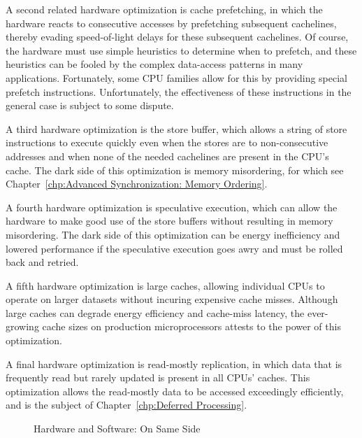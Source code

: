 A second related hardware optimization is cache prefetching, in which
the hardware reacts to consecutive accesses by prefetching subsequent
cachelines, thereby evading speed-of-light delays for these
subsequent cachelines.
Of course, the hardware must use simple heuristics to determine when
to prefetch, and these heuristics can be fooled by the complex data-access
patterns in many applications.
Fortunately, some CPU families allow for this by providing special
prefetch instructions.
Unfortunately, the effectiveness of these instructions in the general
case is subject to some dispute.

A third hardware optimization is the store buffer, which allows a string
of store instructions to execute quickly even when the stores are to
non-consecutive addresses and when none of the needed cachelines are
present in the CPU's cache.
The dark side of this optimization is memory misordering, for which see
Chapter~\ref{chp:Advanced Synchronization: Memory Ordering}.

A fourth hardware optimization is speculative execution, which can
allow the hardware to make good use of the store buffers without
resulting in memory misordering.
The dark side of this optimization can be energy inefficiency and
lowered performance if the speculative execution goes awry and must
be rolled back and retried.

A fifth hardware optimization is large caches, allowing individual
CPUs to operate on larger datasets without incuring expensive cache
misses.
Although large caches can degrade energy efficiency and cache-miss
latency, the ever-growing cache sizes on production microprocessors
attests to the power of this optimization.

A final hardware optimization is read-mostly replication, in which
data that is frequently read but rarely updated is present in all
CPUs' caches.
This optimization allows the read-mostly data to be accessed
exceedingly efficiently, and is the subject of
Chapter~\ref{chp:Deferred Processing}.

\begin{figure}[tb]
\centering
{}
\caption{Hardware and Software: On Same Side}
\end{figure}

